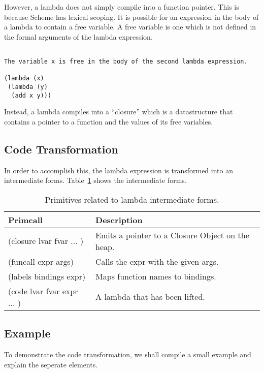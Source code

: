 \documentclass{article}
\begin{document}
However, a lambda does not simply compile into a function pointer. This is because Scheme has lexical scoping. It is possible for an expression in the body of a lambda to contain a free variable. A free variable is one which is not defined in the formal arguments of the lambda expression. 

\begin{verbatim}

The variable x is free in the body of the second lambda expression. 

(lambda (x) 
 (lambda (y) 
  (add x y)))

\end{verbatim}

Instead, a lambda compiles into a ``closure'' which is a datastructure that contains a pointer to a function and the values of its free variables.

\subsection{Code Transformation}

In order to accomplish this, the lambda expression is transformed into an intermediate forms. Table~\ref{tab:lambda_intermediate} shows the intermediate forms. 

\begin{table}[ht]
  \centering
\begin{tabular}{ l l }
  \toprule
  Primcall & Description \\ \hline
  \midrule
  (closure lvar fvar ... ) & Emits a pointer to a Closure Object on the heap.  \\
  (funcall expr args) & Calls the expr with the given args.  \\
  (labels bindings expr) & Maps function names to bindings. \\
  (code lvar fvar expr ... ) & A lambda that has been lifted.  \\
  \bottomrule
\end{tabular}
\caption{Primitives related to lambda intermediate forms.} \label{tab:lambda_intermediate}
\end{table}

\subsection{Example}

To demonstrate the code transformation, we shall compile a small example and explain the seperate elements.
\end{document}
